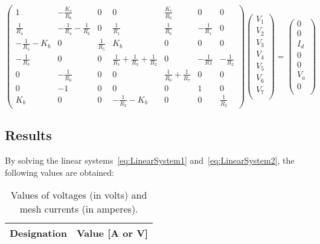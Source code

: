 \begin{equation}
  \begin{pmatrix}
    1 & -\frac{K_c}{R_6} & 0 & 0 & \frac{K_c}{R_6} & 0 & 0 \\
    \frac{1}{R_4} & -\frac{1}{R_4}-\frac{1}{R_6} & 0 & \frac{1}{R_1} & \frac{1}{R_6} & -\frac{1}{R_1} & 0 \\
    -\frac{1}{R_5}-K_b & 0 & \frac{1}{R_5} & K_b & 0 & 0 & 0 \\
    -\frac{1}{R_3} & 0 & 0 & \frac{1}{R_1}+\frac{1}{R_3}+\frac{1}{R_2} & 0 & -\frac{1}{R1} & -\frac{1}{R_2} \\
    0 & -\frac{1}{R_6} & 0 & 0 & \frac{1}{R_6}+\frac{1}{R_7} & 0 & 0 \\
    0 & -1 & 0 & 0 & 0 & 1 & 0 \\
    K_b & 0 & 0 & -\frac{1}{R_2}-K_b & 0 & 0 & \frac{1}{R_2}
  \end{pmatrix}
  \begin{pmatrix}
    V_1  \\
    V_2  \\
    V_3  \\
    V_4  \\
    V_5  \\
    V_6  \\
    V_7  \\
  \end{pmatrix}
  =
  \begin{pmatrix}
    0   \\
    0   \\
    I_d \\
    0   \\
    0   \\
    V_a \\
    0   \\
  \end{pmatrix}
  \label{eq:LinearSystem2}
\end{equation}


\subsection{Results}
By solving the linear systems~\ref{eq:LinearSystem1} and~\ref{eq:LinearSystem2}, the following values are obtained:

\begin{table}[H]
  \centering
  \begin{tabular}{|c|c|}
    \hline
        {\bf Designation} & {\bf Value [A or V]} \\ \hline
        
  \end{tabular}
  \caption{Values of voltages (in volts) and mesh currents (in amperes).}
  \label{tab:Theoretical}
\end{table}



